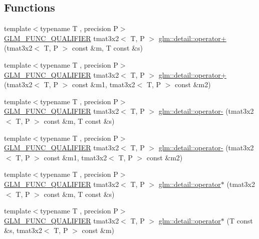 \subsection*{Functions}
\begin{DoxyCompactItemize}
\item 
{\footnotesize template$<$typename T , precision P$>$ }\\\hyperlink{setup_8hpp_a33fdea6f91c5f834105f7415e2a64407}{G\+L\+M\+\_\+\+F\+U\+N\+C\+\_\+\+Q\+U\+A\+L\+I\+F\+I\+ER} tmat3x2$<$ T, P $>$ \hyperlink{namespaceglm_1_1detail_aae9b0494b9a337521d3472f0aa1c9f06}{glm\+::detail\+::operator+} (tmat3x2$<$ T, P $>$ const \&m, T const \&s)
\item 
{\footnotesize template$<$typename T , precision P$>$ }\\\hyperlink{setup_8hpp_a33fdea6f91c5f834105f7415e2a64407}{G\+L\+M\+\_\+\+F\+U\+N\+C\+\_\+\+Q\+U\+A\+L\+I\+F\+I\+ER} tmat3x2$<$ T, P $>$ \hyperlink{namespaceglm_1_1detail_a59481427ed0cc0e950aafeedcf87127f}{glm\+::detail\+::operator+} (tmat3x2$<$ T, P $>$ const \&m1, tmat3x2$<$ T, P $>$ const \&m2)
\item 
{\footnotesize template$<$typename T , precision P$>$ }\\\hyperlink{setup_8hpp_a33fdea6f91c5f834105f7415e2a64407}{G\+L\+M\+\_\+\+F\+U\+N\+C\+\_\+\+Q\+U\+A\+L\+I\+F\+I\+ER} tmat3x2$<$ T, P $>$ \hyperlink{namespaceglm_1_1detail_a4fe72650af0e54ba1672a82fabf2c4d7}{glm\+::detail\+::operator-\/} (tmat3x2$<$ T, P $>$ const \&m, T const \&s)
\item 
{\footnotesize template$<$typename T , precision P$>$ }\\\hyperlink{setup_8hpp_a33fdea6f91c5f834105f7415e2a64407}{G\+L\+M\+\_\+\+F\+U\+N\+C\+\_\+\+Q\+U\+A\+L\+I\+F\+I\+ER} tmat3x2$<$ T, P $>$ \hyperlink{namespaceglm_1_1detail_afb5673c694dbfc475544e9dd12857c87}{glm\+::detail\+::operator-\/} (tmat3x2$<$ T, P $>$ const \&m1, tmat3x2$<$ T, P $>$ const \&m2)
\item 
{\footnotesize template$<$typename T , precision P$>$ }\\\hyperlink{setup_8hpp_a33fdea6f91c5f834105f7415e2a64407}{G\+L\+M\+\_\+\+F\+U\+N\+C\+\_\+\+Q\+U\+A\+L\+I\+F\+I\+ER} tmat3x2$<$ T, P $>$ \hyperlink{namespaceglm_1_1detail_a39ae903db47462da47acafc17dd352e1}{glm\+::detail\+::operator$\ast$} (tmat3x2$<$ T, P $>$ const \&m, T const \&s)
\item 
{\footnotesize template$<$typename T , precision P$>$ }\\\hyperlink{setup_8hpp_a33fdea6f91c5f834105f7415e2a64407}{G\+L\+M\+\_\+\+F\+U\+N\+C\+\_\+\+Q\+U\+A\+L\+I\+F\+I\+ER} tmat3x2$<$ T, P $>$ \hyperlink{namespaceglm_1_1detail_a93bef27dfc80715e01d5646d9aefee66}{glm\+::detail\+::operator$\ast$} (T const \&s, tmat3x2$<$ T, P $>$ const \&m)

\end{DoxyCompactItemize}
